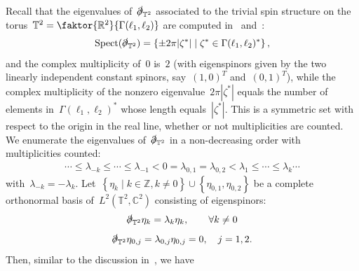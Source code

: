 \documentclass[11pt,final]{amsart}
\newcommand{\R}{\mathbb{R}}
\newcommand{\C}{\mathbb{C}}
\newcommand{\T}{\mathbb{T}}
\newcommand{\pd}{\slashed{\partial}}
\newcommand{\braces}[1]{\left\{#1\right\}} %
\DeclareMathOperator{\Spect}{Spect}
\begin{document}
Recall that the eigenvalues of~$\pd_{\T^2}$ associated to the trivial spin structure on the torus~$\T^2=\faktor{\R^2}{\Gamma(\ell_1,\ell_2)}$ are computed in~\cite{Friedrich1984zur} and~\cite{Ginoux2009Dirac}:  
\begin{align}
    \Spect(\pd_{\T^2}) =
    \braces{ \pm 2\pi |\zeta^*| \mid \zeta^*\in\Gamma(\ell_1,\ell_2)^*},
\end{align}
and the complex multiplicity of~$0$ is~$2$ (with eigenspinors given by the two linearly independent constant spinors, say~$(1,0)^T$ and~$(0,1)^T$), while the complex multiplicity of the nonzero eigenvalue~$2\pi|\zeta^*|$ equals the number of elements in~$\Gamma(\ell_1,\ell_2)^*$ whose length equals~$|\zeta^*|$.
This is a symmetric set with respect to the origin in the real line, whether or not multiplicities are counted. 
We enumerate the eigenvalues of~$\pd_{\T^2}$ in a non-decreasing order with multiplicities counted: 
\begin{align}\label{eq:spectrum-pd}
        \cdots \leq \lambda_{-k}\leq  \cdots \leq \lambda_{-1} <0=\lambda_{0,1}=\lambda_{0,2}<\lambda_1\leq \cdots \leq \lambda_k \cdots  
    \end{align}
with~$\lambda_{-k}=-\lambda_k$. 
Let~$\braces{\eta_k\mid k\in\mathbb{Z},k\neq 0} \cup \braces{\eta_{0,1},\eta_{0,2}}$ be a complete orthonormal basis of~$L^2(\T^2,\C^2)$ consisting of eigenspinors:
\begin{align}
    \pd_{\T^2}\eta_k = \lambda_k \eta_k, \qquad \forall k\neq 0
\end{align}
\begin{align}
    \pd_{\T^2}\eta_{0,j}=\lambda_{0,j}\eta_{0,j}=0, \quad j=1,2. 
\end{align}
Then, similar to the discussion in~\cite{WZ2026Stationary}, we have 
\end{document}
